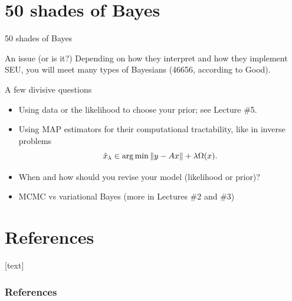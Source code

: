 \documentclass[10pt]{beamer}
\begin{document}
\section{50 shades of Bayes}
\begin{frame}{50 shades of Bayes}
  \begin{alertblock}{An issue (or is it?)}
    Depending on how they interpret and how they implement SEU, you will meet many types of Bayesians (46656, according to Good).
  \end{alertblock}
\begin{block}{A few divisive questions}
\begin{itemize}
\item Using data or the likelihood to choose your prior; see Lecture \#5.
\item Using MAP estimators for their computational tractability, like in inverse problems
$$ \hat x_\lambda \in \operatorname*{arg\,min} \Vert y- Ax\Vert + \lambda\Omega(x).$$
\item When and how should you revise your model (likelihood or prior)?
\item MCMC vs variational Bayes (more in Lectures \#2 and \#3)
\end{itemize}
\end{block}
\end{frame}

\section*{References}
[text]%
\begin{frame}[allowframebreaks]
\frametitle{References}
\small
\printbibliography
\normalsize
\end{frame}
\end{document}
